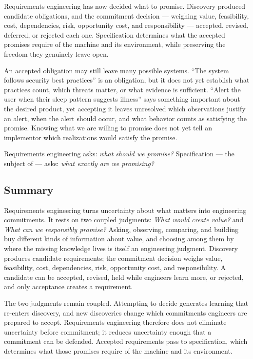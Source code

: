 Requirements engineering has now decided what to promise.
Discovery produced candidate obligations, and the commitment decision --- weighing value, feasibility, cost, dependencies, risk, opportunity cost, and responsibility --- accepted, revised, deferred, or rejected each one.
Specification determines what the accepted promises require of the machine and its environment, while preserving the freedom they genuinely leave open.

An accepted obligation may still leave many possible systems. ``The system follows security best
practices'' is an obligation, but it does not yet establish what practices count, which threats
matter, or what evidence is sufficient. ``Alert the user when their sleep pattern suggests illness''
says something important about the desired product, yet accepting it leaves unresolved which
observations justify an alert, when the alert should occur, and what behavior counts as satisfying
the promise. Knowing what we are willing to promise does not yet tell an implementor which
realizations would satisfy the promise.

Requirements engineering asks: \emph{what should we promise?} Specification --- the subject of
\citet{ch-specification} --- asks: \emph{what exactly are we promising?}

\subsection{Summary}\label{summary}

Requirements engineering turns uncertainty about what matters into engineering commitments.
It rests on two coupled judgments: \emph{What would create value?} and \emph{What can we responsibly promise?}
Asking, observing, comparing, and building buy different kinds of information about value, and choosing among them by where the missing knowledge lives is itself an engineering judgment.
Discovery produces candidate requirements; the commitment decision weighs value, feasibility, cost, dependencies, risk, opportunity cost, and responsibility.
A candidate can be accepted, revised, held while engineers learn more, or rejected, and only acceptance creates a requirement.

The two judgments remain coupled.
Attempting to decide generates learning that re-enters discovery, and new discoveries change which commitments engineers are prepared to accept.
Requirements engineering therefore does not eliminate uncertainty before commitment; it reduces uncertainty enough that a commitment can be defended.
Accepted requirements pass to specification, which determines what those promises require of the machine and its environment.

